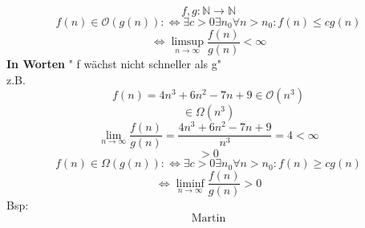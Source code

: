 $$f,g:\mathbb N \rightarrow\mathbb N$$
$$f(n)\in \mathcal O(g(n)):\Leftrightarrow\exists c>0\exists n_0\forall n>n_0:f(n)\leq cg(n)$$
$$\Leftrightarrow \limsup_{n\rightarrow\infty}\frac{f(n)}{g(n)}<\infty$$
\textbf{In Worten} " f wächst nicht schneller als g"\\
z.B. $$f(n)=4n^3+6n^2-7n+9\in\mathcal O(n^3)$$
$$\in \Omega(n^3)$$
$$\lim_{n\rightarrow \infty}\frac{f(n)}{g(n)}=\frac{4n^3+6n^2-7n+9}{n^3}=4<\infty$$
$$>0$$
$$f(n)\in\Omega(g(n)):\Leftrightarrow\exists c>0 \exists n_0 \forall n>n_0:f(n)\ge cg(n)$$
$$\Leftrightarrow \liminf_{n\rightarrow\infty}\frac{f(n)}{g(n)}>0$$
Bsp:
$$\mbox{Martin}$$